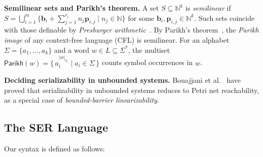 \medskip
\noindent
\textbf{Semilinear sets and Parikh’s theorem.}
A set $S\subseteq\mathbb N^k$ is \textit{semilinear} if 
$S=\bigcup_{i=1}^m \{\mathbf b_i+\sum_{j=1}^{r_i} n_j\mathbf p_{i,j}\mid n_j\in\mathbb N\}$ 
for some $\mathbf b_i,\mathbf p_{i,j}\in\mathbb N^k$. 
Such sets coincide with those definable by \textit{Presburger arithmetic}~\cite{Pr29}. 
By Parikh’s theorem~\cite{Parikh66}, the \textit{Parikh image} of any context-free language (CFL) is semilinear. 
For an alphabet $\Sigma=\{a_1,\dots,a_k\}$ and a word $w\in L\subseteq\Sigma^*$,  the multiset
$\mathsf{Parikh}(w)=\{\,a_i^{|w|_{a_i}}\mid a_i\in\Sigma\,\}$ counts symbol occurrences in $w$.



\medskip
\noindent
\textbf{Deciding serializability in unbounded systems.} 
Bouajjani et al.~\cite{BoEmEnHa13} have proved that serializability in unbounded systems reduces to Petri net reachability, as a special case of \textit{bounded-barrier linearizability}.


\subsection{The SER Language}
Our \toolname{} syntax is defined as follows: 

